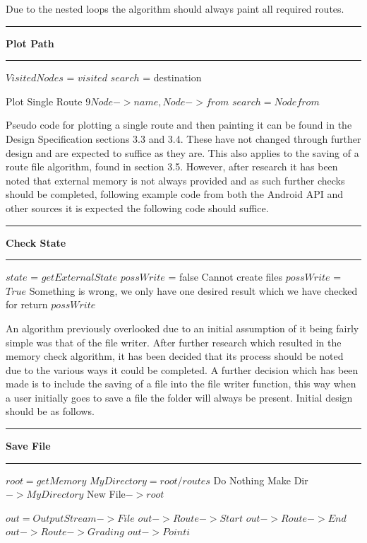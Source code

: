 Due to the nested loops the algorithm should always paint all required routes. 
\vspace{0.3cm}
\hrule
\vspace{0.1cm}
\textbf{Plot Path}
\vspace{0.1cm}
\hrule
\vspace{0.1cm}
\begin{algorithmic}[1]
\State $Visited Nodes$ = $visited$
\State$search$ = destination
	
		\State Plot Single Route 9$Node->name, Node->from$
		\State $search = Node from$
	\EndIf
\EndFor
\EndFor
\end{algorithmic}
Pseudo code for plotting a single route and then painting it can be found in the Design Specification sections 3.3 and 3.4. These have not changed through further design and are expected to suffice as they are. This also applies to the saving of a route file algorithm, found in section 3.5. However, after research it has been noted that external memory is not always provided and as such further checks should be completed\cite{storage}, following example code from both the Android API and other sources\cite{check} it is expected the following code should suffice. 
\vspace{0.3cm}
\hrule
\vspace{0.1cm}
\textbf{Check State}
\vspace{0.1cm}
\hrule
\vspace{0.1cm}
\begin{algorithmic}[1]
\State $state$ = $getExternalState$
\State $possWrite$ = false
	\State Cannot create files
	\State $possWrite$ = $True$
\Else{}
	\State Something is wrong, we only have one desired result which we have checked for
	\EndIf
	\State return $possWrite$

\end{algorithmic}
An algorithm previously overlooked due to an initial assumption of it being fairly simple was that of the file writer. After further research which resulted in the memory check algorithm\cite{check}, it has been decided that its process should be noted due to the various ways it could be completed. A further decision which has been made is to include the saving of a file into the file writer function, this way when a user initially goes to save a file the folder will always be present. Initial design should be as follows. 
\vspace{0.3cm}
\hrule
\vspace{0.2cm}
\textbf{Save File}
\vspace{0.1cm}
\hrule
\vspace{0.1cm}
\begin{algorithmic}[1]
\State $root = get Memory$
\State $My Directory = root/routes$
	\State Do Nothing
	\Else
\State Make Dir $->My Directory$
\EndIf
\State New File$-> root$

\State $out = Output Stream -> File$
\State $out -> Route ->Start$
\State $out -> Route -> End$
\State $out -> Route -> Grading$
	\State $out -> Point i$
\EndFor

\end{algorithmic}
